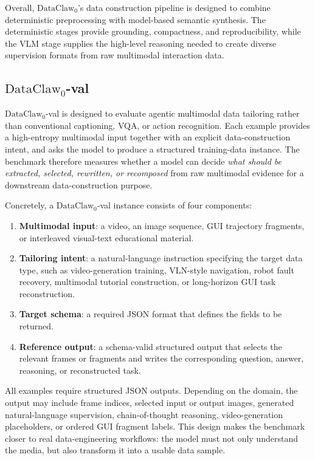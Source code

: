 Overall, $\text{DataClaw}_0$'s data construction pipeline is designed to combine deterministic preprocessing with model-based semantic synthesis. The deterministic stages provide grounding, compactness, and reproducibility, while the VLM stage supplies the high-level reasoning needed to create diverse supervision formats from raw multimodal interaction data.

\subsection{$\text{DataClaw}_0$-val}
\label{app:benchmark}
$\text{DataClaw}_0$-val is designed to evaluate agentic multimodal data tailoring rather than conventional captioning, VQA, or action recognition. Each example provides a high-entropy multimodal input together with an explicit data-construction intent, and asks the model to produce a structured training-data instance. The benchmark therefore measures whether a model can decide \emph{what should be extracted, selected, rewritten, or recomposed} from raw multimodal evidence for a downstream data-construction purpose.

Concretely, a $\text{DataClaw}_0$-val instance consists of four components:
\begin{enumerate}
    \item \textbf{Multimodal input}: a video, an image sequence, GUI trajectory fragments, or interleaved visual-text educational material.
    \item \textbf{Tailoring intent}: a natural-language instruction specifying the target data type, such as video-generation training, VLN-style navigation, robot fault recovery, multimodal tutorial construction, or long-horizon GUI task reconstruction.
    \item \textbf{Target schema}: a required JSON format that defines the fields to be returned.
    \item \textbf{Reference output}: a schema-valid structured output that selects the relevant frames or fragments and writes the corresponding question, answer, reasoning, or reconstructed task.
\end{enumerate}

All examples require structured JSON outputs. Depending on the domain, the output may include frame indices, selected input or output images, generated natural-language supervision, chain-of-thought reasoning, video-generation placeholders, or ordered GUI fragment labels. This design makes the benchmark closer to real data-engineering workflows: the model must not only understand the media, but also transform it into a usable data sample.

